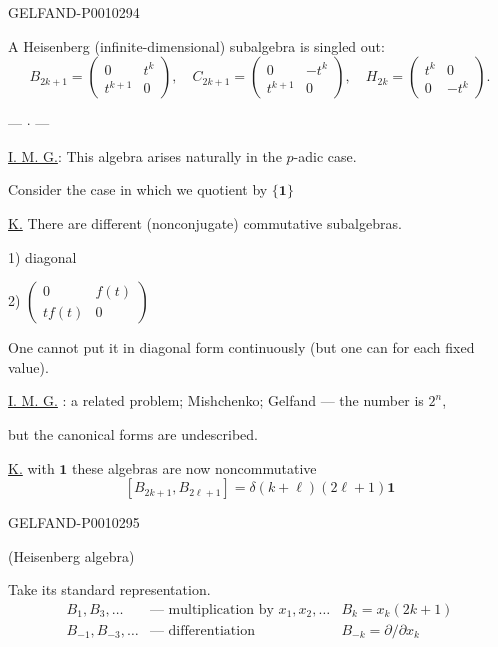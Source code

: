 \begin{GelfandAdjacentEvidence}{GELFAND-P001029}{4}


A Heisenberg (infinite-dimensional) subalgebra is singled out:
\begin{equation*}
B_{2k+1}=\begin{pmatrix}0&t^k\\t^{k+1}&0\end{pmatrix},\quad
C_{2k+1}=\begin{pmatrix}0&-t^k\\t^{k+1}&0\end{pmatrix},\quad
H_{2k}=\begin{pmatrix}t^k&0\\0&-t^k\end{pmatrix}.
\tag{5}
\end{equation*}

\begin{center}--- $\cdot$ ---\end{center}

\underline{I. M. G.}: This algebra arises naturally in the \(p\)-adic case.

Consider the case in which we quotient by $\{\mathbf1\}$

\underline{K.} There are different (nonconjugate) commutative subalgebras.

1) diagonal

2) $\begin{pmatrix}0&f(t)\\tf(t)&0\end{pmatrix}$

One cannot put it in diagonal form continuously (but one can for each fixed value).

\underline{I. M. G.} : a related problem; \quad Mishchenko; Gelfand --- the number is $2^n$,

\hspace{5em}but the canonical forms are undescribed.

\underline{K.} with \(\mathbf1\) these algebras are now noncommutative
\[
[B_{2k+1},B_{2\ell+1}]=\delta(k+\ell)(2\ell+1)\mathbf1
\]
\end{GelfandAdjacentEvidence}
\begin{GelfandAdjacentEvidence}{GELFAND-P001029}{5}


(Heisenberg algebra)

Take its standard representation.
\[
\begin{array}{ll||l}
B_1,B_3,\ldots & \text{--- multiplication by }x_1,x_2,\ldots & B_k=x_k(2k+1)\\
B_{-1},B_{-3},\ldots & \text{--- differentiation} & B_{-k}=\partial/\partial x_k
\end{array}
\]
\end{GelfandAdjacentEvidence}
